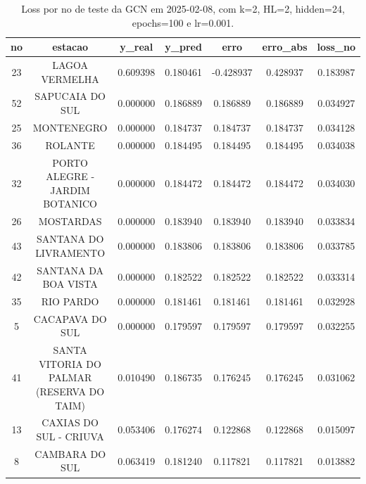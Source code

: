 \begin{table}[h]
\centering
\caption{Loss por no de teste da GCN em 2025-02-08, com k=2, HL=2, hidden=24, epochs=100 e lr=0.001.}
\label{tab:gcn_loss_k2_hl2_h24_e100_d20250208}
\begin{tabular}{ccccccc}
\toprule
no & estacao & y\_real & y\_pred & erro & erro\_abs & loss\_no \\
\midrule
23 & LAGOA VERMELHA & 0.609398 & 0.180461 & -0.428937 & 0.428937 & 0.183987 \\
52 & SAPUCAIA DO SUL & 0.000000 & 0.186889 & 0.186889 & 0.186889 & 0.034927 \\
25 & MONTENEGRO & 0.000000 & 0.184737 & 0.184737 & 0.184737 & 0.034128 \\
36 & ROLANTE & 0.000000 & 0.184495 & 0.184495 & 0.184495 & 0.034038 \\
32 & PORTO ALEGRE - JARDIM BOTANICO & 0.000000 & 0.184472 & 0.184472 & 0.184472 & 0.034030 \\
26 & MOSTARDAS & 0.000000 & 0.183940 & 0.183940 & 0.183940 & 0.033834 \\
43 & SANTANA DO LIVRAMENTO & 0.000000 & 0.183806 & 0.183806 & 0.183806 & 0.033785 \\
42 & SANTANA DA BOA VISTA & 0.000000 & 0.182522 & 0.182522 & 0.182522 & 0.033314 \\
35 & RIO PARDO & 0.000000 & 0.181461 & 0.181461 & 0.181461 & 0.032928 \\
5 & CACAPAVA DO SUL & 0.000000 & 0.179597 & 0.179597 & 0.179597 & 0.032255 \\
41 & SANTA VITORIA DO PALMAR (RESERVA DO TAIM) & 0.010490 & 0.186735 & 0.176245 & 0.176245 & 0.031062 \\
13 & CAXIAS DO SUL - CRIUVA & 0.053406 & 0.176274 & 0.122868 & 0.122868 & 0.015097 \\
8 & CAMBARA DO SUL & 0.063419 & 0.181240 & 0.117821 & 0.117821 & 0.013882 \\
\bottomrule
\end{tabular}
\end{table}
